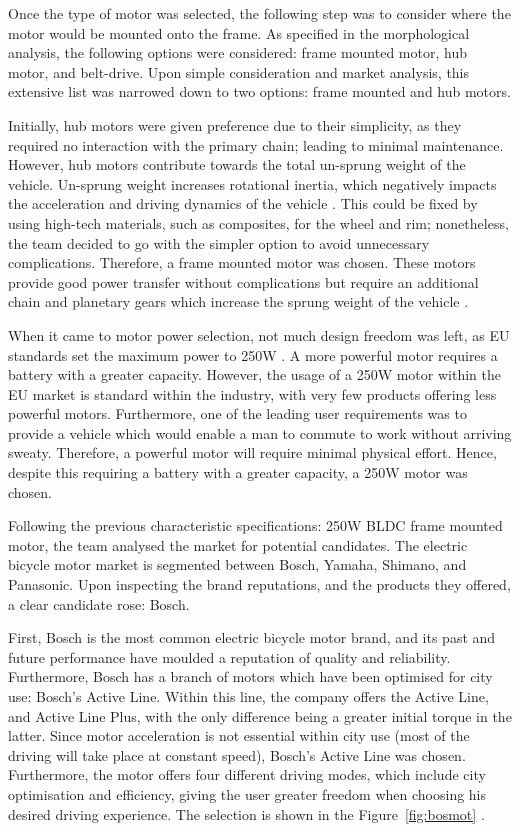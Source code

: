 \documentclass[a4paper,11pt]{article}
\begin{document}
Once the type of motor was selected, the following step was to consider where the motor would be mounted onto the frame. As specified in the morphological analysis, the following options were considered: frame mounted motor, hub motor, and belt-drive. Upon simple consideration and market analysis, this extensive list was narrowed down to two options: frame mounted and hub motors. 

Initially, hub motors were given preference due to their simplicity, as they required no interaction with the primary chain; leading to minimal maintenance. However, hub motors contribute towards the total un-sprung weight of the vehicle. Un-sprung weight increases rotational inertia, which negatively impacts the acceleration and driving dynamics of the vehicle \cite{fen13}. This could be fixed by using high-tech materials, such as composites, for the wheel and rim; nonetheless, the team decided to go with the simpler option to avoid unnecessary complications. Therefore, a frame mounted motor was chosen. These motors provide good power transfer without complications but require an additional chain and planetary gears which increase the sprung weight of the vehicle \cite{rag14}. 

When it came to motor power selection, not much design freedom was left, as EU standards set the maximum power to 250W \cite{15194}. A more powerful motor requires a battery with a greater capacity. However, the usage of a 250W motor within the EU market is standard within the industry, with very few products offering less powerful motors. Furthermore, one of the leading user requirements was to provide a vehicle which would enable a man to commute to work without arriving sweaty. Therefore, a powerful motor will require minimal physical effort. Hence, despite this requiring a battery with a greater capacity, a 250W motor was chosen. 

Following the previous characteristic specifications: 250W BLDC frame mounted motor, the team analysed the market for potential candidates. The electric bicycle motor market is segmented between Bosch, Yamaha, Shimano, and Panasonic. Upon inspecting the brand reputations, and the products they offered, a clear candidate rose: Bosch. 

First, Bosch is the most common electric bicycle motor brand, and its past and future performance have moulded a reputation of quality and reliability. Furthermore, Bosch has a branch of motors which have been optimised for city use: Bosch's Active Line. Within this line, the company offers the Active Line, and Active Line Plus, with the only difference being a greater initial torque in the latter. Since motor acceleration is not essential within city use (most of the driving will take place at constant speed), Bosch's Active Line was chosen. Furthermore, the motor offers four different driving modes, which include city optimisation and efficiency, giving the user greater freedom when choosing his desired driving experience. The selection is shown in the Figure~\ref{fig:bosmot} \cite{bosch18}.
\end{document}

